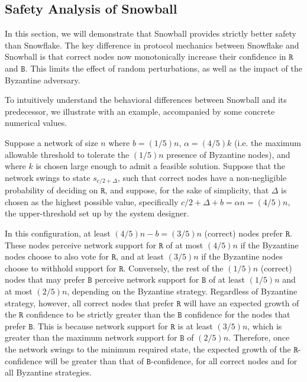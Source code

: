 \documentclass[letterpaper,twocolumn,10pt]{article}
\newcommand{\tronly}[2]{#1}
\theoremstyle{definition}
\begin{document}
\begin{appendices}
\subsection{Safety Analysis of Snowball}\tronly{}{\vspace{-0.5em}}
In this section, we will demonstrate that Snowball provides strictly better
safety than Snowflake.
The key difference in protocol mechanics between Snowflake and Snowball is that correct nodes now monotonically increase their confidence in $\mathtt{R}$ and $\mathtt{B}$.
This limits the effect of random perturbations, as well as the impact of the Byzantine adversary.

To intuitively understand the behavioral differences between Snowball and its predecessor, we illustrate with an example, accompanied by some concrete numerical values.

Suppose a network of size $n$ where $b = (1/5)n$, $\alpha = (4/5)k$ (i.e. the maximum allowable threshold to tolerate the $(1/5)n$ presence of Byzantine nodes), and where $k$ is chosen large enough to admit a feasible solution. 
Suppose that the network swings to state $s_{c/2 + \Delta}$, such that correct nodes have a non-negligible probability of deciding on $\mathtt{R}$, and suppose, for the sake of simplicity, that $\Delta$ is chosen as the highest possible value, specifically $c/2 + \Delta + b = \alpha n = (4/5)n$, the upper-threshold set up by the system designer. 

In this configuration, at least $(4/5)n - b = (3/5)n$ (correct) nodes prefer $\mathtt{R}$. 
These nodes perceive network support for $\mathtt{R}$ of at most $(4/5)n$ if the Byzantine nodes choose to also vote for $\mathtt{R}$, and at least $(3/5)n$ if the Byzantine nodes choose to withhold support for $\mathtt{R}$. 
Conversely, the rest of the $(1/5)n$ (correct) nodes that may prefer $\mathtt{B}$ perceive network support for $\mathtt{B}$ of at least $(1/5)n$ and at most $(2/5)n$, depending on the Byzantine strategy. 
Regardless of Byzantine strategy, however, all correct nodes that prefer $\mathtt{R}$ will have an expected growth of the $\mathtt{R}$ confidence to be strictly greater than the $\mathtt{B}$ confidence for the nodes that prefer $\mathtt{B}$. 
This is because network support for $\mathtt{R}$ is at least $(3/5)n$, which is greater than the maximum network support for $\mathtt{B}$ of $(2/5)n$. 
Therefore, once the network swings to the minimum required state, the expected growth of the $\mathtt{R}$-confidence will be greater than that of $\mathtt{B}$-confidence, for all correct nodes and for all Byzantine strategies. 


\end{appendices}
\end{document}
